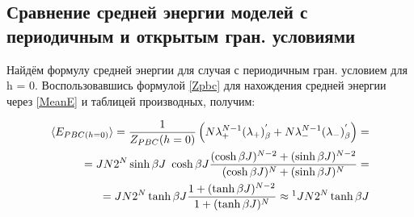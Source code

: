 \subsection{Сравнение средней энергии моделей с периодичным и открытым гран. условиями}

Найдём формулу средней энергии для случая с периодичным гран. условием для h = 0. Воспользовавшись формулой \eqref{Zpbc} для нахождения средней энергии через \eqref{MeanE} и таблицей производных, получим:

\begin{align*}
    \la E_{PBC (h = 0)} \ra = \frac{1}{Z\pbc(h = 0)}\left(N\lp^{N-1}(\lp)\prpb + N\lm^{N-1}(\lm)\prpb \right) = \\
    = JN2^{N}\sinh{\bj}\ \cosh{\bj} \frac{(\cosh{\bj})^{N-2} + (\sinh{\bj})^{N-2}}{(\cosh{\bj})^{N} + (\sinh{\bj})^{N}} = \\
    = JN2^{N} \tanh{\bj} \frac{1 + (\tanh{\bj})^{N-2}}{1 + (\tanh{\bj})^{N}} \approx \footnotemark JN2^{N} \tanh{\bj}
\end{align*}


